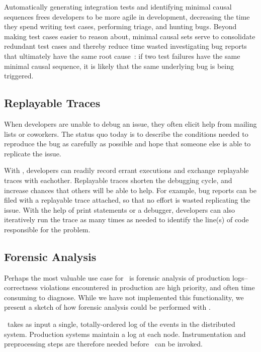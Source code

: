 Automatically generating integration tests and identifying
minimal causal sequences frees developers to be more agile in
development, decreasing the time they spend writing test cases,
performing triage, and
hunting bugs. Beyond making test cases easier to reason about, minimal causal
sets serve to consolidate redundant test cases and thereby reduce time wasted
investigating bug reports that ultimately have the same root
cause~\cite{Zeller:2002:SIF:506201.506206}:
if two test failures have the same minimal causal sequence, it is
likely that the same underlying bug is being triggered.

\subsection{Replayable Traces}

When developers are unable to debug an issue, they often elicit help from
mailing lists or coworkers. The status quo today is to describe the conditions needed to
reproduce the bug as carefully as possible and hope that someone else is able
to replicate the issue.

With \projectname, developers can readily record errant executions and
exchange replayable traces with eachother.
Replayable traces shorten the debugging cycle, and increase chances that others
will be able to help. For example, bug reports can be filed with a replayable trace
attached, so that no
effort is wasted replicating the issue. With the help of print statements or a
debugger, developers can also iteratively run the trace as many times as
needed to identify the line(s) of code responsible for the problem.

\subsection{Forensic Analysis}

Perhaps the most valuable use case for \simulator~is forensic analysis of
production logs--correctness violations encountered in production are
high priority, and often time consuming to diagnose. While we have not
implemented this functionality, we present a sketch of
how forensic analysis could be performed with \simulator.

\Simulator~takes as input a single, totally-ordered log of the events in the
distributed system. Production systems maintain a log at each node.
Instrumentation and preprocessing steps are therefore needed before \simulator~can be
invoked.

